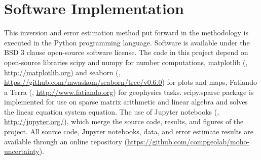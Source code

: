 \section{Software Implementation}
This inversion and error estimation method put forward in the methodology is executed in the Python programming language. Software is available under the BSD 3 clause open-source software license. The code in this project depend on open-source libraries scipy and numpy \citep{Harris2020} for number computations, matplotlib (\cite{Hunter2007}, \url{http://matplotlib.org}) and seaborn (\cite{Waskom2015}, \url{https://github.com/mwaskom/seaborn/tree/v0.6.0}) for plots and maps, Fatiando a Terra (\cite{Uieda2013a}, \url{http://www.fatiando.org}) for geophysics tasks. scipy.sparse package is implemented for use on sparse matrix arithmetic and linear algebra and solves the linear equation system equation.
The use of Jupyter notebooks (\cite{Perez2007}, \url{http://jupyter.org/}), which merge the source code, results, and figures of the project.
All source code, Jupyter notebooks, data, and error estimate results are available through an online repository (\url{https://github.com/compgeolab/moho-uncertainty}).